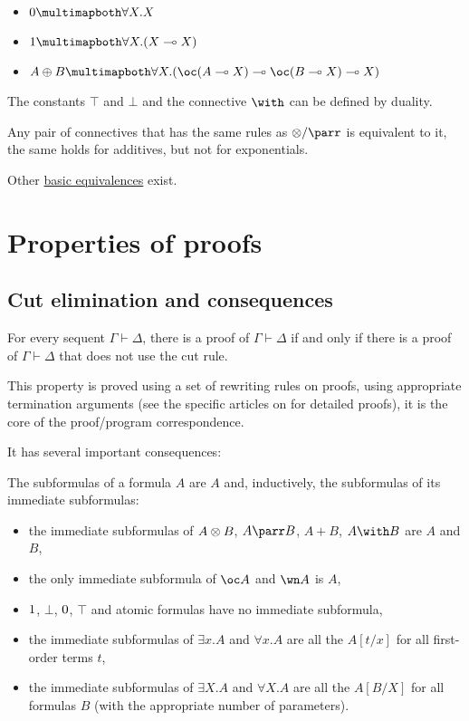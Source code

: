 \begin{itemize}
\tightlist
\item
  \(\zero \linequiv \forall X.X\)
\item
  \(\one \linequiv \forall X.(X \limp X)\)
\item
  \(A \plus B \linequiv \forall X.(\oc(A \limp X) \limp \oc(B \limp X) \limp X)\)
\end{itemize}

The constants \(\top\) and \(\bot\) and the connective \(\with\) can be
defined by duality.

Any pair of connectives that has the same rules as \(\tens/\parr\) is
equivalent to it, the same holds for additives, but not for
exponentials.

Other \hyperref[list-of-equivalences]{basic equivalences} exist.

\section{Properties of proofs}\label{properties-of-proofs}

\subsection{Cut elimination and consequences}\label{cut-elimination-and-consequences}

\begin{theorem}
For every sequent $\Gamma\vdash\Delta$, there is a proof of
$\Gamma\vdash\Delta$ if and only if there is a proof of
$\Gamma\vdash\Delta$ that does not use the cut rule.
\end{theorem}

This property is proved using a set of rewriting rules on proofs, using
appropriate termination arguments (see the specific articles on
 for detailed proofs), it is the
core of the proof/program correspondence.

It has several important consequences:

\begin{definition}[subformula]
The subformulas of a formula $A$ are $A$ and, inductively, the subformulas of its immediate subformulas:
\begin{itemize}
\item the immediate subformulas of $A\otimes B$, $A\parr B$, $A\plus B$, $A\with B$ are $A$ and $B$,
\item the only immediate subformula of $\oc A$ and $\wn A$ is $A$,
\item $1$, $\bot$, $0$, $\top$ and atomic formulas have no immediate subformula,
\item the immediate subformulas of $\exists x.A$ and $\forall x.A$ are all the $A[t/x]$ for all first-order terms $t$,
\item the immediate subformulas of $\exists X.A$ and $\forall X.A$ are all the $A[B/X]$ for all formulas $B$ (with the appropriate number of parameters).
\end{itemize}
\end{definition}

